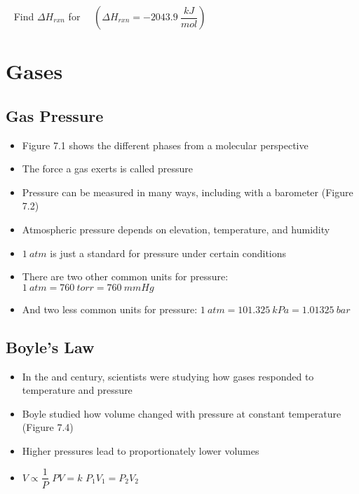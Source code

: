 \documentclass[12pt, openany, letterpaper]{memoir}
\begin{document}
\begin{itemize}
	      ~\hphantom{Practice:} Find $\Delta H_{rxn}$ for~~  \hspace{1em} $\left(\Delta H_{rxn}=-2043.9~\dfrac{kJ}{mol}\right)$
\end{itemize}

\chapter{Gases}
\section{Gas Pressure}
\begin{itemize}
	\item Figure 7.1 shows the different phases from a molecular perspective
	\item The force a gas exerts is called pressure
	\item Pressure can be measured in many ways, including with a barometer (Figure 7.2)
	\item Atmospheric pressure depends on elevation, temperature, and humidity
	\item $1~atm$ is just a standard for pressure under certain conditions
	\item There are two other common units for pressure: $1~atm=760~torr=760~mmHg$
	\item And two less common units for pressure: $1~atm=101.325~kPa=1.01325~bar$
\end{itemize}
\section{Boyle's Law}
\begin{itemize}
	\item In the  and  century, scientists were studying how gases responded to temperature and pressure
	\item Boyle studied how volume changed with pressure at constant temperature (Figure 7.4)
	\item Higher pressures lead to proportionately lower volumes
	\item $V\propto \dfrac{1}{P}$ \hspace{2em} $PV=k$ \hspace{2em} $P_1V_1=P_2V_2$
\end{itemize}
\end{document}
